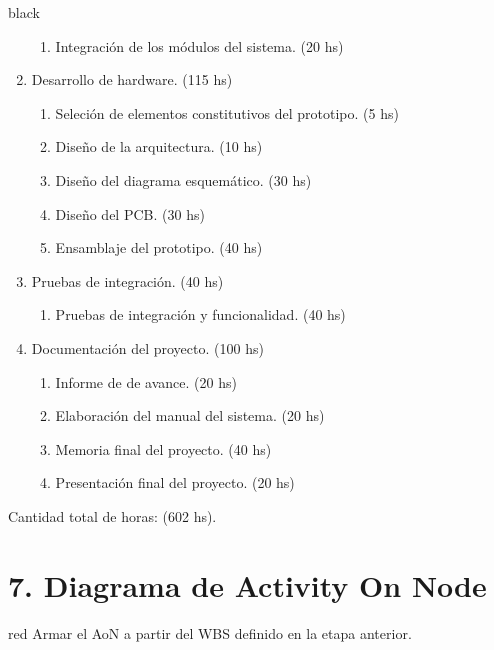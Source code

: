 \documentclass[11pt]{charter}
\begin{document}
\begin{consigna}{black}
\begin{enumerate}
\begin{enumerate}
		\item Integración de los módulos del sistema. \hfill(20 hs)
	\end{enumerate}
    \item Desarrollo de hardware. \hfill(115 hs)
    \begin{enumerate}
    	\item Seleción de elementos constitutivos del prototipo. \hfill(5 hs)
    	\item Diseño de la arquitectura. \hfill(10 hs)
    	\item Diseño del diagrama esquemático. \hfill(30 hs)
    	\item Diseño del PCB. \hfill(30 hs)
    	\item Ensamblaje del prototipo. \hfill(40 hs)
    \end{enumerate}
	\item Pruebas de integración. \hfill(40 hs)
	\begin{enumerate}
		\item Pruebas de integración y funcionalidad. \hfill(40 hs)
	\end{enumerate}
	\item Documentación del proyecto. \hfill(100 hs)
	\begin{enumerate}
		\item Informe de de avance. \hfill(20 hs)
		\item Elaboración del manual del sistema. \hfill(20 hs)
		\item Memoria final del proyecto. \hfill(40 hs)
		\item Presentación final del proyecto. \hfill(20 hs)
	\end{enumerate}
    	
\end{enumerate}

Cantidad total de horas: (602 hs).

\end{consigna}

\section{7. Diagrama de Activity On Node}
\label{sec:AoN}

\begin{consigna}{red}
Armar el AoN a partir del WBS definido en la etapa anterior. 



\end{consigna}
\end{document}
